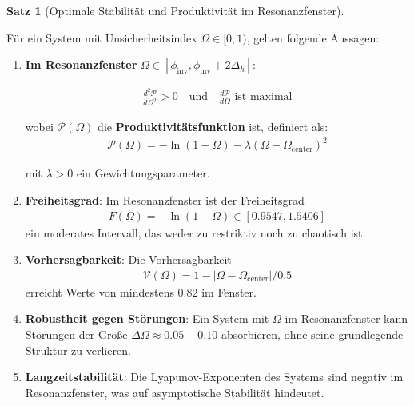 \documentclass[a4paper, 12pt, twoside, openright]{report}
\theoremstyle{definition}
\theoremstyle{definition}
\newtheorem{satz}{Satz}[chapter]
\begin{document}
\begin{satz}[Optimale Stabilität und Produktivität im Resonanzfenster]
\label{satz:resonance_window_stability}

Für ein System mit Unsicherheitsindex $\Omega \in [0, 1)$, gelten folgende Aussagen:

\begin{enumerate}
	\item \textbf{Im Resonanzfenster} $\Omega \in [\phi_{\text{inv}}, \phi_{\text{inv}} + 2\Delta_h]$:
	
	\begin{align}
	\frac{d^2 \mathcal{P}}{d\Omega^2} > 0 \quad \text{und} \quad \frac{d\mathcal{P}}{d\Omega} \text{ ist maximal}
	\end{align}
	
	wobei $\mathcal{P}(\Omega)$ die \textbf{Produktivitätsfunktion} ist, definiert als:
	\begin{align}
	\mathcal{P}(\Omega) = -\ln(1-\Omega) - \lambda(\Omega - \Omega_{\text{center}})^2
	\end{align}
	
	mit $\lambda > 0$ ein Gewichtungsparameter.
	
	\item \textbf{Freiheitsgrad}: Im Resonanzfenster ist der Freiheitsgrad
	\begin{align}
	F(\Omega) = -\ln(1-\Omega) \in [0.9547, 1.5406]
	\end{align}
	ein moderates Intervall, das weder zu restriktiv noch zu chaotisch ist.
	
	\item \textbf{Vorhersagbarkeit}: Die Vorhersagbarkeit 
	\begin{align}
	\mathcal{V}(\Omega) = 1 - |\Omega - \Omega_{\text{center}}| / 0.5
	\end{align}
	erreicht Werte von mindestens $0.82$ im Fenster.
	
	\item \textbf{Robustheit gegen Störungen}: Ein System mit $\Omega$ im Resonanzfenster kann Störungen der Größe $\Delta \Omega \approx 0.05-0.10$ absorbieren, ohne seine grundlegende Struktur zu verlieren.
	
	\item \textbf{Langzeitstabilität}: Die Lyapunov-Exponenten des Systems sind negativ im Resonanzfenster, was auf asymptotische Stabilität hindeutet.
\end{enumerate}

\end{satz}
\end{document}
